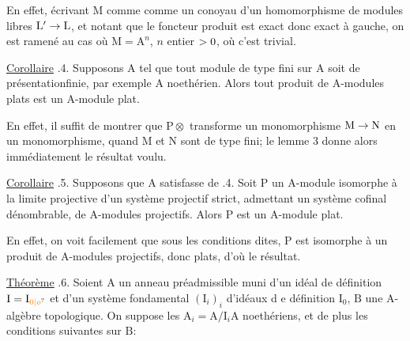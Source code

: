 En effet, écrivant $\mathrm M$ comme comme un conoyau d'un homomorphisme de modules libres  $\mathrm L'\to\mathrm L$, et notant que le foncteur produit est exact donc exact à gauche, on est ramené au cas où $\mathrm M=\mathrm A^n$, $n$ entier $>0$, où c'est trivial.

\uline{Corollaire} .4. Supposons $\mathrm A$ tel que tout module de type fini sur $\mathrm A$ soit de présentationfinie, par exemple $\mathrm A$ noethérien. Alors tout produit de $\mathrm A$-modules plats est un $\mathrm A$-module plat.

En effet, il suffit de montrer que $\mathrm P\otimes$ transforme un monomorphisme $\mathrm M\to\mathrm N$ en un monomorphisme, quand $\mathrm M$ et $\mathrm N$ sont de type fini; le lemme 3 donne alors immédiatement le résultat voulu.

\uline{Corollaire} .5. Supposons que $\mathrm A$ satisfasse  de .4. Soit $\mathrm P$ un $\mathrm A$-module  isomorphe à la limite projective     d'un système projectif strict, admettant un système cofinal dénombrable, de $\mathrm A$-modules projectifs. Alors $\mathrm P$ est un $\mathrm A$-module plat.

En effet, on voit facilement que sous les conditions dites, $\mathrm P$ est isomorphe à un produit de $\mathrm A$-modules projectifs, donc plats, d'où le résultat.

\uline{Théorème} .6. Soient $\mathrm A$ un anneau préadmissible muni d'un idéal de définition $\mathrm I=\mathrm I_{\unsure{0|o}}$ et d'un système fondamental $(\mathrm I_i)_i$ d'idéaux d e définition $\mathrm I_0$, $\mathrm B$ une $\mathrm A$-algèbre topologique. On suppose les $\mathrm A_i=\mathrm A/\mathrm I_i\mathrm A$ noethériens, et de plus les conditions suivantes sur $\mathrm B$:

